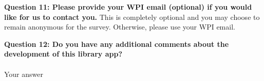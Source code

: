 \noindent\textbf{Question 11: Please provide your WPI email (optional) if you would like for us to contact you.}
\newline
This is completely optional and you may choose to remain anonymous for the survey. Otherwise, please use your WPI email.
\newline


\noindent\textbf{Question 12: Do you have any additional comments about the development of this library app?}
\paragraph{}
Your answer